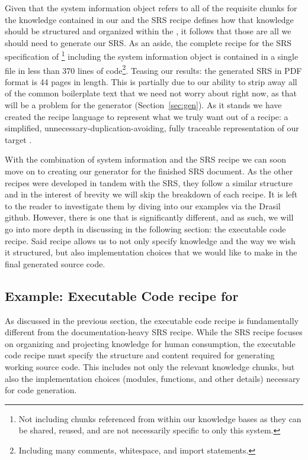 
Given that the system information object refers to all of the requisite chunks 
for the knowledge contained in our \sfs{} and the SRS recipe defines how that 
knowledge should be structured and organized within the \sf{}, it follows that 
those are all we should need to generate our SRS. As an aside, the complete 
recipe for the SRS specification of \gb{}\footnote{Not including chunks 
referenced from within our knowledge bases as they can be shared, reused, and 
are not necessarily specific to only this system.} including the system 
information object is contained in a single file in less than 370 lines of 
code\footnote{Including many comments, whitespace, and import statements.}. 
Teasing our results: the generated SRS in PDF format is 44 pages in length. 
This is partially due to our ability to strip away all of the common 
boilerplate text that we need not worry about right now, as that will be a 
problem for the generator (Section~\ref{sec:gen}). As it stands we have created 
the recipe language to represent what we truly want out of a recipe: a 
simplified, unnecessary-duplication-avoiding, fully traceable representation of 
our target \sf{}.

With the combination of system information and the SRS recipe we can soon move
on to creating our generator for the finished SRS document. As the other \sf{} 
recipes were developed in tandem with the SRS, they follow a similar structure 
and in the interest of brevity we will skip the breakdown of each recipe. It is 
left to the reader to investigate them by diving into our examples via the 
Drasil github. However, there is one \sf{} that is significantly different, and 
as such, we will go into more depth in discussing in the following section: the 
executable code recipe. Said recipe allows us to not only specify knowledge and 
the way we wish it structured, but also implementation choices that we would 
like to make in the final generated source code.

\subsection{Example: Executable Code recipe for \gb{}}
\label{sec:gbCodeRecipe}

As discussed in the previous section, the executable code recipe is 
fundamentally different from the documentation-heavy SRS recipe. While the SRS 
recipe focuses on organizing and projecting knowledge for human consumption, 
the executable code recipe must specify the structure and content required for 
generating working source code. This includes not only the relevant knowledge 
chunks, but also the implementation choices (modules, functions, and other 
details) necessary for code generation. 

